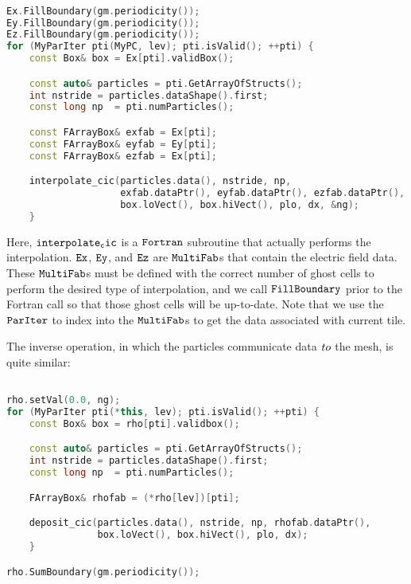 \begin{lstlisting}[language=cpp]

Ex.FillBoundary(gm.periodicity());
Ey.FillBoundary(gm.periodicity());
Ez.FillBoundary(gm.periodicity());
for (MyParIter pti(MyPC, lev); pti.isValid(); ++pti) {
    const Box& box = Ex[pti].validBox();

    const auto& particles = pti.GetArrayOfStructs();
    int nstride = particles.dataShape().first;
    const long np  = pti.numParticles();

    const FArrayBox& exfab = Ex[pti];
    const FArrayBox& eyfab = Ey[pti];
    const FArrayBox& ezfab = Ex[pti];

    interpolate_cic(particles.data(), nstride, np,
                    exfab.dataPtr(), eyfab.dataPtr(), ezfab.dataPtr(),
                    box.loVect(), box.hiVect(), plo, dx, &ng);
    }

\end{lstlisting}

Here, $\tt{interpolate_cic}$ is a $\tt{Fortran}$ subroutine that actually performs the interpolation. $\tt{Ex}$, $\tt{Ey}$, and $\tt{Ez}$ are $\tt{MultiFab}$s
that contain the electric field data. These $\tt{MultiFab}$s must be defined with the correct number of ghost cells to perform the desired type of interpolation,
and we call $\tt{FillBoundary}$ prior to the Fortran call so that those ghost cells will be up-to-date. Note that we use the $\tt{ParIter}$ to index into the 
$\tt{MultiFab}$s to get the data associated with current tile.

The inverse operation, in which the particles communicate data $\emph{to}$ the mesh, is quite similar:

\begin{lstlisting}[language=cpp]

rho.setVal(0.0, ng);
for (MyParIter pti(*this, lev); pti.isValid(); ++pti) {
    const Box& box = rho[pti].validbox();

    const auto& particles = pti.GetArrayOfStructs();
    int nstride = particles.dataShape().first;
    const long np  = pti.numParticles();

    FArrayBox& rhofab = (*rho[lev])[pti];

    deposit_cic(particles.data(), nstride, np, rhofab.dataPtr(), 
                box.loVect(), box.hiVect(), plo, dx);
    }

rho.SumBoundary(gm.periodicity());

\end{lstlisting}

